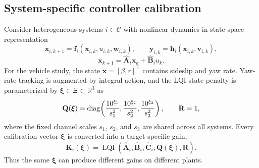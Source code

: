 \documentclass{l4dc2026}
\begin{document}
\subsection{System-specific controller calibration}
Consider heterogeneous systems $i\in\mathcal C$ with nonlinear dynamics in state-space representation
\begin{equation}
 \mathbf{x}_{i,k+1}=\mathbf{f}_i(\mathbf{x}_{i,k},u_{i,k},\mathbf{w}_{i,k}),
 \qquad
 \mathbf{y}_{i,k}=\mathbf{h}_i(\mathbf{x}_{i,k},\mathbf{v}_{i,k}),
 \label{eq:true_plant_generic}
\end{equation}
\begin{equation}
 \mathbf{x}_{k+1}=\hat{\mathbf A}_i\mathbf{x}_k+\hat{\mathbf B}_i u_k.
 \label{eq:identified_model}
\end{equation}
For the vehicle study, the state $\mathbf{x}=[\beta,r]^\top$ contains sideslip and yaw rate. Yaw-rate tracking is augmented by integral action, and the LQI state penalty is parameterized by $\boldsymbol{\xi}\in\Xi\subset\mathbb R^3$ as
\begin{equation}
 \color{JWgreen}
 \mathbf Q(\boldsymbol{\xi})
 =\operatorname{diag}\!\left(\frac{10^{\xi_1}}{s_1^2},\frac{10^{\xi_2}}{s_2^2},\frac{10^{\xi_3}}{s_3^2}\right),
 \qquad \mathbf R=1,
 \label{eq:lqi_weights}
\end{equation}
where the fixed channel scales $s_1$, $s_2$, and $s_3$ are shared across all systems. Every calibration vector $\boldsymbol{\xi}$ is converted into a target-specific gain,
\begin{equation}
 \mathbf K_i(\boldsymbol{\xi})
 =\operatorname{LQI}\!\left(\hat{\mathbf A}_i,\hat{\mathbf B}_i,\hat{\mathbf C}_i,
 \mathbf Q(\boldsymbol{\xi}),\mathbf R\right).
 \label{eq:lqi_gain}
\end{equation}
Thus the same $\boldsymbol{\xi}$ can produce different gains on different plants.  
\end{document}
